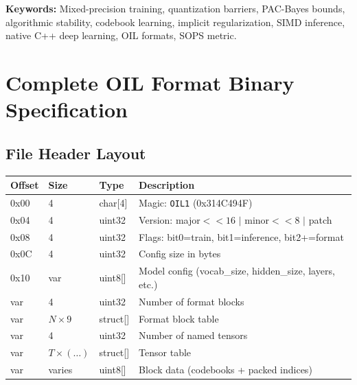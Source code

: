 \documentclass[11pt,a4paper,twoside]{report}
\theoremstyle{definition}
\begin{document}
\vfill
\noindent\textbf{Keywords:} Mixed-precision training, quantization barriers, PAC-Bayes bounds, algorithmic stability, codebook learning, implicit regularization, SIMD inference, native C++ deep learning, OIL formats, SOPS metric.

\tableofcontents
\listoftables
{}
















\printbibliography[heading=bibintoc,title={References}]

\appendix

\chapter{Complete OIL Format Binary Specification}
\label{app:format_spec}

\section{File Header Layout}

\begin{longtable}{>{\ttfamily}l l l P{5cm}}
\toprule
\textnormal{Offset} & \textnormal{Size} & \textnormal{Type} & \textnormal{Description} \\
\midrule
\endhead
0x00 & 4 & char[4] & Magic: \texttt{OIL1} (0x314C494F) \\
0x04 & 4 & uint32 & Version: major$<<16$ $\vert$ minor$<<8$ $\vert$ patch \\
0x08 & 4 & uint32 & Flags: bit0=train, bit1=inference, bit2+=format \\
0x0C & 4 & uint32 & Config size in bytes \\
0x10 & var & uint8[] & Model config (vocab\_size, hidden\_size, layers, etc.) \\
var & 4 & uint32 & Number of format blocks \\
var & $N\times 9$ & struct[] & Format block table \\
var & 4 & uint32 & Number of named tensors \\
var & $T\times(\ldots)$ & struct[] & Tensor table \\
var & varies & uint8[] & Block data (codebooks + packed indices) \\
\bottomrule
\end{longtable}
\end{document}
